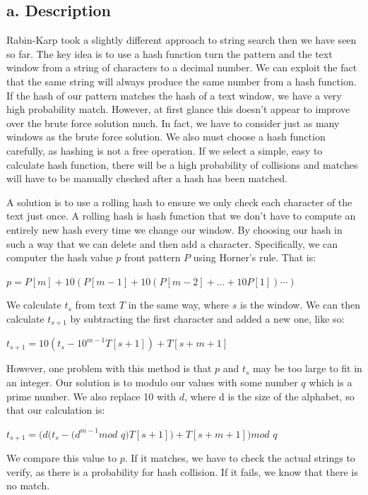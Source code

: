 \documentclass{chi2005}
\begin{document}
\subsection{a. Description}

Rabin-Karp\cite{RK} took a slightly different approach to string search then we have seen so far. The key idea is to 
use a hash function turn the pattern and the text window from a string of characters to a decimal number. We can exploit the fact that the same string will always produce the same number from a hash function. If the hash of our pattern matches the hash of a text window, we have a very high probability match. However, at first glance this doesn't appear to improve over the brute force solution much. In fact, we have to consider just as many windows as the brute force solution. We also must choose a hash function carefully, as hashing is not a free operation. If we select a simple, easy to calculate hash function, there will be a high probability of collisions and matches will have to be manually checked after a hash has been matched. 

A solution is to use a rolling hash to ensure we only check each character of the text just once. A rolling hash is hash function that we don't have to compute an entirely new hash every time we change our window. By choosing our hash in such a way that we can delete and then add a character. Specifically, we can computer the hash value $p$  front pattern $P$ using Horner's rule. That is:

$p = P[m] + 10 ( P[m-1] +10(P[m-2] + ... + 10P[1])\cdots)$

We calculate $t_s$  from text $T$ in the same way, where $s$ is the window. We can then calculate $t_{s+1}$ by subtracting the first character and added a new one, like so:

$t_{s+1} = 10(t_s - 10^{m-1}T[s+1]) + T[s+m+1]$

However, one problem with this method is that $p$ and $t_s$ may be too large to fit in an integer. Our solution is to modulo our values with some number $q$ which is a prime number. We also replace 10 with $d$, where d is the size of the alphabet, so that our calculation is:

$t_{s+1} = (d(t_s - (d^{m-1} mod$ $q)T[s+1]) + T[s+m+1]) mod$ $q$

We compare this value to $p$. If it matches, we have to check the actual strings to verify, as there is a probability for hash collision. If it fails, we know that there is no match.
\end{document}
